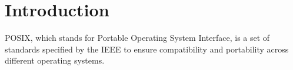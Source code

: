 \section{Introduction}
POSIX, which stands for Portable Operating System Interface, is a set of standards specified by the IEEE to ensure compatibility and portability across different operating systems.
\newpage